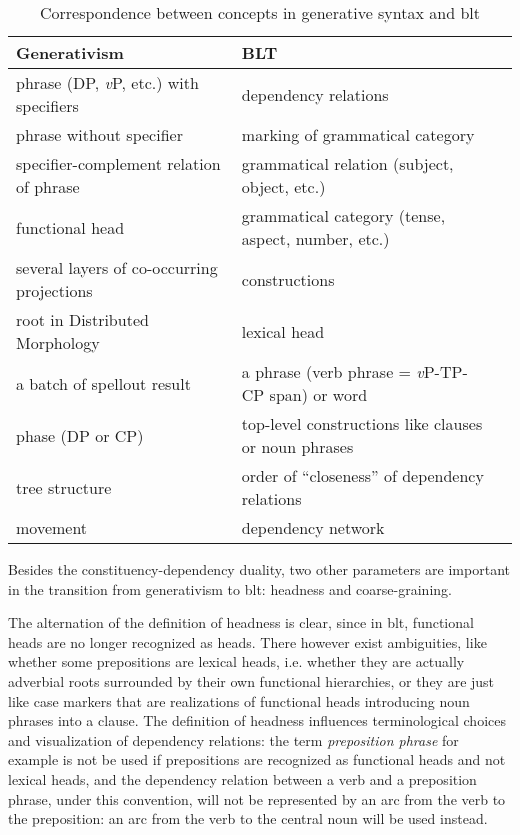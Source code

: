 \documentclass[UTF8, a4paper, oneside, scheme=plain, 12pt]{ctexbook}
\newcommand*{\term}[1]{\emph{#1}}
\newcommand{\vP}{\textit{v}P}
\begin{document}
{\begin{table}[H]
    \caption{Correspondence between concepts in generative syntax and \acs{blt}}
    \label{tbl:theory.blt}
    \centering
    \small
    \begin{tabular}{@{}lll@{}}
    \toprule
    Generativism                               & BLT                                          \\ \midrule
    phrase (DP, \vP, etc.) with specifiers     & dependency relations                          \\
    phrase without specifier                   & marking of grammatical category               \\
    specifier-complement relation of phrase    & grammatical relation (subject, object, etc.)  \\
    functional head                            & grammatical category (tense, aspect, number,  etc.)                         \\
    several layers of co-occurring projections & constructions                                 \\
    root in Distributed Morphology             & lexical head                                          \\
    a batch of spellout result                 & a phrase (verb phrase = \vP-TP-CP span) or word    \\
    phase (DP or CP)                           & top-level constructions like clauses or noun phrases                        \\
    tree structure                             & order of ``closeness'' of dependency relations  \\
    movement                                   & dependency network                            \\ \bottomrule
    \end{tabular}
\end{table}

Besides the constituency-dependency duality, 
two other parameters are important in the transition from generativism to \ac{blt}:
headness and coarse-graining. 

The alternation of the definition of headness is clear, 
since in \ac{blt}, 
functional heads are no longer recognized as heads.
There however exist ambiguities, 
like whether some prepositions are lexical heads,
i.e. whether they are actually adverbial roots surrounded by 
their own functional hierarchies, 
or they are just like case markers 
that are realizations of functional heads
introducing noun phrases into a clause.
The definition of headness influences terminological choices 
and visualization of dependency relations:
the term \term{preposition phrase} for example is not be used
if prepositions are recognized as functional heads and not lexical heads, 
and the dependency relation between a verb and a preposition phrase, 
under this convention,
will not be represented by an arc from the verb to the preposition: 
an arc from the verb to the central noun will be used instead.

}
\end{document}

